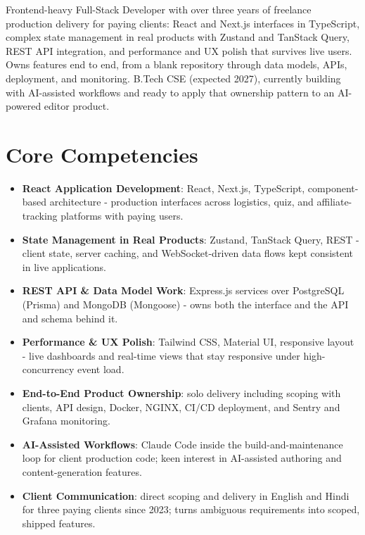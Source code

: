 \documentclass[11pt,a4paper,sans]{moderncv}
\begin{document}
\makecvtitle


\vspace{6pt}
\small{Frontend-heavy Full-Stack Developer with over three years of freelance production delivery for paying clients: React and Next.js interfaces in TypeScript, complex state management in real products with Zustand and TanStack Query, REST API integration, and performance and UX polish that survives live users. Owns features end to end, from a blank repository through data models, APIs, deployment, and monitoring. B.Tech CSE (expected 2027), currently building with AI-assisted workflows and ready to apply that ownership pattern to an AI-powered editor product.}


\section{Core Competencies}
\vspace{1pt}
\begin{itemize}

\item \textbf{React Application Development}: React, Next.js, TypeScript, component-based architecture - production interfaces across logistics, quiz, and affiliate-tracking platforms with paying users.

\item \textbf{State Management in Real Products}: Zustand, TanStack Query, REST - client state, server caching, and WebSocket-driven data flows kept consistent in live applications.

\item \textbf{REST API \& Data Model Work}: Express.js services over PostgreSQL (Prisma) and MongoDB (Mongoose) - owns both the interface and the API and schema behind it.

\item \textbf{Performance \& UX Polish}: Tailwind CSS, Material UI, responsive layout - live dashboards and real-time views that stay responsive under high-concurrency event load.

\item \textbf{End-to-End Product Ownership}: solo delivery including scoping with clients, API design, Docker, NGINX, CI/CD deployment, and Sentry and Grafana monitoring.

\item \textbf{AI-Assisted Workflows}: Claude Code inside the build-and-maintenance loop for client production code; keen interest in AI-assisted authoring and content-generation features.

\item \textbf{Client Communication}: direct scoping and delivery in English and Hindi for three paying clients since 2023; turns ambiguous requirements into scoped, shipped features.

\end{itemize}
\end{document}

